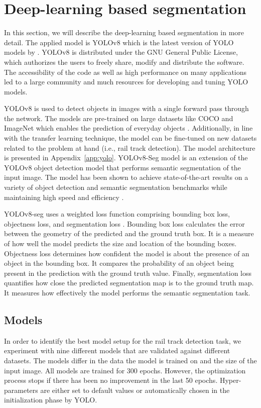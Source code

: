 \documentclass[Master,MDS,english]{BASE/twbook} %
\begin{document}
\section{Deep-learning based segmentation}

In this section, we will describe the deep-learning based segmentation in more detail. The applied model is YOLOv8 which is the latest version of YOLO models by \cite{Jocher_Ultralytics_YOLO_2023}.  YOLOv8 is distributed under the GNU General Public License, which authorizes the users to freely share, modify and distribute the software. The accessibility of the code as well as high performance on many applications led to a large community and much resources for developing and tuning YOLO models. 

YOLOv8 is used to detect objects in images with a single forward pass through the network. The models are pre-trained on large datasets like COCO and ImageNet which enables the prediction of everyday objects \citep{Krishnakumar}. Additionally, in line with the transfer learning technique, the  model can be fine-tuned on new datasets related to the problem at hand (i.e., rail track detection).
The model architecture is presented in Appendix~\ref{app:yolo}.
YOLOv8-Seg model is an extension of the YOLOv8 object detection model that performs semantic segmentation of the input image. The  model has been shown to achieve state-of-the-art results on a variety of object detection and semantic segmentation benchmarks while maintaining high speed and efficiency \citep{Krishnakumar}. 

YOLOv8-seg uses a weighted loss function comprising bounding box loss, objectness loss, and segmentation loss \citep{loss_function}. Bounding box loss calculates the error between the geometry of the predicted and the ground truth box. It is a measure of how well the model predicts the size and location of the bounding boxes. Objectness loss determines how confident the model is about the presence of an object in the bounding box. It compares the probability of an object being present in the prediction with the ground truth value.
Finally, segmentation loss quantifies how close the predicted segmentation map is to the ground truth map. It measures how effectively the model performs the semantic segmentation task.


\subsection{Models}

In order to identify the best model setup for the rail track detection task, we experiment with nine different models that are validated against different datasets. The models differ in the data the model is trained on and the size of the input image. All models are trained for 300 epochs. However, the optimization process stops if there has been no improvement in the last 50 epochs. 
Hyper-parameters are either set to default values or automatically chosen in the initialization phase by YOLO.
\end{document}
